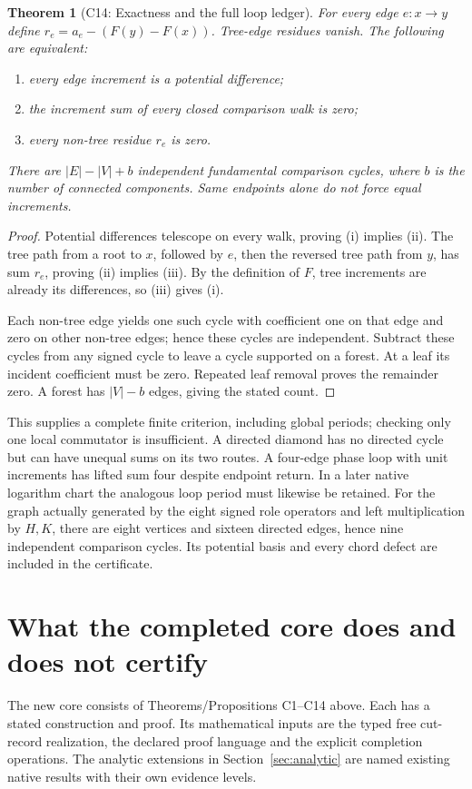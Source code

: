 \documentclass[11pt]{article}
\newtheorem{theorem}{Theorem}[section]
\begin{document}
\begin{theorem}[C14: Exactness and the full loop ledger]
\label{thm:paths}
For every edge $e:x\to y$ define $r_e=a_e-(F(y)-F(x))$.
Tree-edge residues vanish. The following are equivalent:
\begin{enumerate}[label=(\roman*)]
\item every edge increment is a potential difference;
\item the increment sum of every closed comparison walk is zero;
\item every non-tree residue $r_e$ is zero.
\end{enumerate}
There are $|E|-|V|+b$ independent fundamental comparison cycles, where $b$
is the number of connected components. Same endpoints alone do not force
equal increments.
\end{theorem}
\begin{proof}
Potential differences telescope on every walk, proving (i) implies (ii).
The tree path from a root to $x$, followed by $e$, then the reversed tree
path from $y$, has sum $r_e$, proving (ii) implies (iii). By the definition
of $F$, tree increments are already its differences, so (iii) gives (i).

Each non-tree edge yields one such cycle with coefficient one on that edge
and zero on other non-tree edges; hence these cycles are independent. Subtract
these cycles from any signed cycle to leave a cycle supported on a forest.
At a leaf its incident coefficient must be zero. Repeated leaf removal proves
the remainder zero. A forest has $|V|-b$ edges, giving the stated count.
\end{proof}
This supplies a complete finite criterion, including global periods; checking
only one local commutator is insufficient. A directed diamond has no directed
cycle but can have unequal sums on its two routes. A four-edge phase loop
with unit increments has lifted sum four despite endpoint return. In a later
native logarithm chart the analogous loop period must likewise be retained.
For the graph actually generated by the eight signed role operators and
left multiplication by $H,K$, there are eight vertices and sixteen directed
edges, hence nine independent comparison cycles. Its potential basis and
every chord defect are included in the certificate.

\section{What the completed core does and does not certify}
\label{sec:status}
The new core consists of Theorems/Propositions C1--C14 above. Each has a
stated construction and proof. Its mathematical inputs are the typed free
cut-record realization, the declared proof language and the explicit
completion operations. The analytic extensions in Section~\ref{sec:analytic}
are named existing native results with their own evidence levels.
\end{document}

